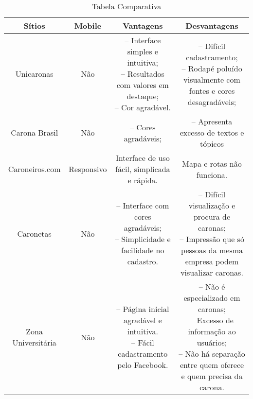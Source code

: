 \documentclass{sig-alternate}
\begin{document}
\begin{table*}[b]
\centering
\caption{Tabela Comparativa}
\begin{tabular}{|c|c|c|c|} \hline
{\bf Sítios}
&{\bf Mobile}
&{\bf Vantagens}
&{\bf Desvantagens}\\ \hline %
Unicaronas	
&Não			
&\parbox{5cm}{-- Interface simples e intuitiva;\\
-- Resultados com valores em destaque;\\
-- Cor agradável.}
&\parbox{5cm}{-- Difícil cadastramento;\\
-- Rodapé poluído visualmente com fontes e cores desagradáveis;}
\\ \hline
Carona Brasil
&Não 		
& -- Cores agradáveis;
& -- Apresenta excesso de textos e tópicos
\\ \hline
Caroneiros.com
&Responsivo
&Interface de uso fácil, simplicada e rápida.
&Mapa e rotas não funciona.
\\ \hline
Caronetas
&Não			
&\parbox{5cm}{\vspace{1pt}-- Interface com cores agradáveis;\\
-- Simplicidade e facilidade no cadastro.}
&\parbox{5cm}{\vspace{3pt}-- Difícil visualização e procura de caronas;\\
-- Impressão que só pessoas da mesma empresa podem visualizar caronas.\\}
\\ \hline
Zona Universitária
&Não			
&\parbox{5cm}{\vspace{1pt}-- Página inicial agradável e intuitiva.\\
-- Fácil cadastramento pelo Facebook.}
&\parbox{5cm}{\vspace{3pt}-- Não é especializado em caronas;\\
-- Excesso de informação ao usuários;\\
-- Não há separação entre quem oferece e quem precisa da carona.\\}
\\ \hline
\end{tabular}
\end{table*}
\end{document}
